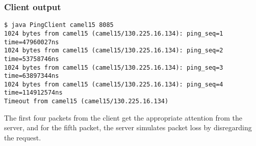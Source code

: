 \documentclass[12pt,a4paper]{article}
\begin{document}
\subsubsection{Client output}
\begin{lstlisting}[]
$ java PingClient camel15 8085
1024 bytes from camel15 (camel15/130.225.16.134): ping_seq=1 time=47960027ns
1024 bytes from camel15 (camel15/130.225.16.134): ping_seq=2 time=53758746ns
1024 bytes from camel15 (camel15/130.225.16.134): ping_seq=3 time=63897344ns
1024 bytes from camel15 (camel15/130.225.16.134): ping_seq=4 time=114912574ns
Timeout from camel15 (camel15/130.225.16.134)
\end{lstlisting}
The first four packets from the client get the appropriate attention from the
server, and for the fifth packet, the server simulates packet loss by
disregarding the request.
\end{document}
